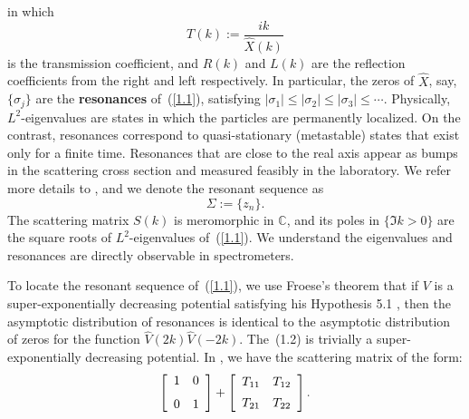 \documentclass[10pt,a4paper]{article}
\theoremstyle{plain}
\theoremstyle{definition}
\theoremstyle{remark}
\numberwithin{equation}{section}
\begin{document}
in which
\begin{equation}\label{7}
T(k):=\frac{ik}{\hat{X}(k)}
\end{equation}
is the transmission coefficient, and $R(k)$ and $L(k)$ are the reflection coefficients from the right and left respectively. 
In particular, the zeros of $\hat{X}$, say, $\{\sigma_{j}\}$ are the {\bf resonances} of~(\ref{1.1}), satisfying $|\sigma_{1}|\leq|\sigma_{2}|\leq|\sigma_{3}|\leq\cdots$. Physically, $L^{2}$-eigenvalues are states in which the particles are permanently localized. On the contrast, resonances correspond to quasi-stationary (metastable) states that exist only for a finite time. Resonances that are close to the real axis appear as bumps in the scattering cross section and  measured feasibly in the laboratory. We refer more details to \cite{Dyatlov,Marletta,Mellin}, and we denote the resonant sequence as
$$\Sigma:=\{z_{n}\}.$$ 
The scattering matrix $S(k)$ is meromorphic in $\mathbb{C}$, and its poles in $\{\Im k>0\}$ are the square roots of $L^{2}$-eigenvalues of~(\ref{1.1}). We understand the eigenvalues and resonances are directly observable in spectrometers. \par
To locate the resonant sequence of~(\ref{1.1}), we use Froese's theorem \cite[Theorem\,1.3]{Froese} that if $V$ is a super-exponentially decreasing potential satisfying his Hypothesis 5.1 \cite[p.\,261]{Froese}, then the asymptotic distribution of resonances is identical to the asymptotic distribution of zeros for the function $\hat{V}(2k)\hat{V}(-2k)$. The~(1.2) is trivially a super-exponentially decreasing potential. In \cite[p.\,257]{Froese}, we have the scattering matrix of the form:
$$\left[\begin{array}{cc}1 & 0 \vspace{7pt}\\0 & 1\end{array}\right]+\left[\begin{array}{cc}T_{11} & T_{12}\vspace{5pt}\\T_{21} & T_{22}\end{array}\right].$$
\par
 
\end{document}
